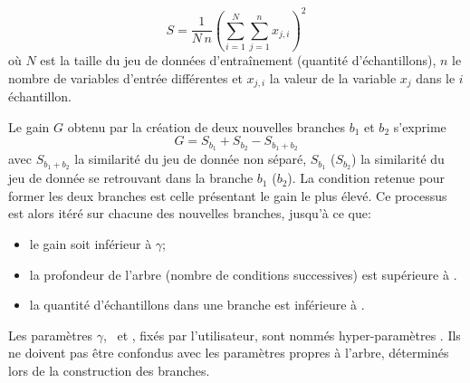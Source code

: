 \begin{equation}
S = \frac{1}{N\,n} \left(\sum_{i=1}^N \sum_{j=1}^n x_{j,i} \right)^2
\end{equation}
où $N$ est la taille du jeu de données d'entraînement (quantité d'échantillons),
$n$ le nombre de variables d'entrée différentes
et $x_{j,i}$ la valeur de la variable $x_j$ dans le $i$ échantillon.
\par
Le gain $G$ obtenu par la création de deux nouvelles branches $b_1$ et $b_2$ s'exprime
\begin{equation}
G = S_{b_1} + S_{b_2} - S_{b_1+b_2}
\end{equation}
avec
$S_{b_1+b_2}$ la similarité du jeu de donnée non séparé,
$S_{b_1}$ ($S_{b_2}$) la similarité du jeu de donnée se retrouvant dans la branche $b_1$ ($b_2$).
La condition retenue pour former les deux branches est celle présentant le gain le plus élevé.
Ce processus est alors itéré sur chacune des nouvelles branches, jusqu'à ce que:
\begin{itemize}
\item le gain soit inférieur à $\gamma$;
\item la profondeur de l'arbre (nombre de conditions successives) est supérieure à \MaxDepth.
\item la quantité d'échantillons dans une branche est inférieure à \MinChildWeight.
\end{itemize}
Les paramètres $\gamma$, \MaxDepth\ et \MinChildWeight, fixés par l'utilisateur, sont nommés \og hyper-paramètres \fg.
Ils ne doivent pas être confondus avec les paramètres propres à l'arbre, déterminés lors de la construction des branches.
